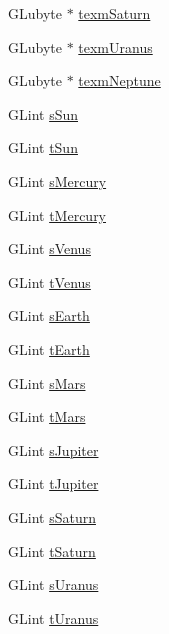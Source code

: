 \begin{DoxyCompactItemize}
\item 
G\+Lubyte $\ast$ \mbox{\hyperlink{class_scene_texture_a709891945f1538bbc8c44af2b6764c12}{texm\+Saturn}}
\item 
G\+Lubyte $\ast$ \mbox{\hyperlink{class_scene_texture_af7181f52f463ff4f930aeeb0822249cf}{texm\+Uranus}}
\item 
G\+Lubyte $\ast$ \mbox{\hyperlink{class_scene_texture_a9fa1bf870d39f1982f5492540eb7b284}{texm\+Neptune}}
\item 
G\+Lint \mbox{\hyperlink{class_scene_texture_a25f15686621dc6caa3ab018fb56d6674}{s\+Sun}}
\item 
G\+Lint \mbox{\hyperlink{class_scene_texture_ae27c6af9e09b61b8b82e42e44dc23995}{t\+Sun}}
\item 
G\+Lint \mbox{\hyperlink{class_scene_texture_ac4f9cb6f993bcaa2425b98116bc19c9a}{s\+Mercury}}
\item 
G\+Lint \mbox{\hyperlink{class_scene_texture_a61bc0a019debb88459abbfeb0596c5b5}{t\+Mercury}}
\item 
G\+Lint \mbox{\hyperlink{class_scene_texture_ada8a14d5318c37b2a153e5d0b7308661}{s\+Venus}}
\item 
G\+Lint \mbox{\hyperlink{class_scene_texture_ac7404076871e4eccddae3486c0b127e4}{t\+Venus}}
\item 
G\+Lint \mbox{\hyperlink{class_scene_texture_ae1772ad81c05c1861e93432f76a93e0f}{s\+Earth}}
\item 
G\+Lint \mbox{\hyperlink{class_scene_texture_a8f2837ea24c08d4fbc89361ab5862ffb}{t\+Earth}}
\item 
G\+Lint \mbox{\hyperlink{class_scene_texture_ae7e2fc818536ae88c04d2e1f13ef3006}{s\+Mars}}
\item 
G\+Lint \mbox{\hyperlink{class_scene_texture_a9335b0e58e70b58638123b4bda2e814f}{t\+Mars}}
\item 
G\+Lint \mbox{\hyperlink{class_scene_texture_ab604fd9bff0f6d57dc5ee3e0ded071d5}{s\+Jupiter}}
\item 
G\+Lint \mbox{\hyperlink{class_scene_texture_acda99f9f004061dd21d53ff9418a0326}{t\+Jupiter}}
\item 
G\+Lint \mbox{\hyperlink{class_scene_texture_ae6bfffe6f3b9b2ae15ef0a8918899a7d}{s\+Saturn}}
\item 
G\+Lint \mbox{\hyperlink{class_scene_texture_ac05fe1bcd058d9c77766da3bc08c1b45}{t\+Saturn}}
\item 
G\+Lint \mbox{\hyperlink{class_scene_texture_ab9a4fa22043bde7393f263ef3d220981}{s\+Uranus}}
\item 
G\+Lint \mbox{\hyperlink{class_scene_texture_ae85f2fd16e84021ab9d020298af5dc30}{t\+Uranus}}

\end{DoxyCompactItemize}
